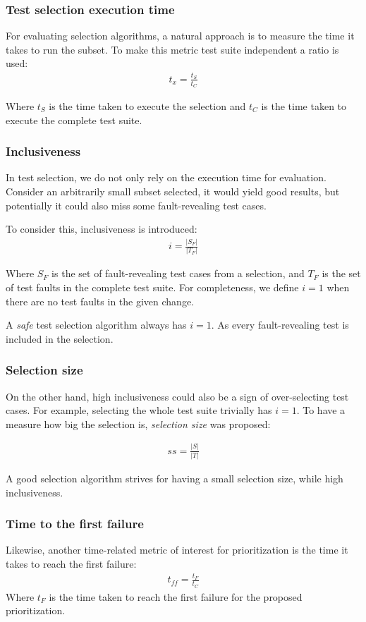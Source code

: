 \subsubsection{Test selection execution time}
For evaluating selection algorithms, a natural approach is to measure the time it takes to run the subset. To make 
this metric test suite independent a ratio is used:
\begin{align*}
    t_x = \frac{t_S}{t_C}
\end{align*}

Where $t_S$ is the time taken to execute the selection and $t_C$ is the time taken to execute the complete test suite.

\subsubsection{Inclusiveness}
In test selection, we do not only rely on the execution time for evaluation. Consider an arbitrarily small subset selected, it would yield good results,
but potentially it could also miss some fault-revealing test cases.

To consider this, inclusiveness is introduced:
\begin{align*}
i = \frac{|S_F|}{|T_F|}
\end{align*}

Where $S_F$ is the set of fault-revealing test cases from a selection, and $T_F$ is the set of test faults in the complete
test suite. For completeness, we define $i=1$ when there are no test faults in the given change.

A \emph{safe} test selection algorithm \cite{366926} always has $i = 1$. As every fault-revealing test is included in the selection.

\subsubsection{Selection size}
On the other hand, high inclusiveness could also be a sign of over-selecting test cases. For example, selecting the whole test
suite trivially has $i=1$. To have a measure how big the selection is, \emph{selection size} was proposed:

\begin{align*}
    ss = \frac{|S|}{|T|}
\end{align*}

A good selection algorithm strives for having a small selection size, while high inclusiveness.

\subsubsection{Time to the first failure}
Likewise, another time-related metric of interest for prioritization is the time it takes to reach the first failure:
\begin{align*}
    t_{ff} = \frac{t_F}{t_C}
\end{align*}
Where $t_F$ is the time taken to reach the first failure for the proposed prioritization.

